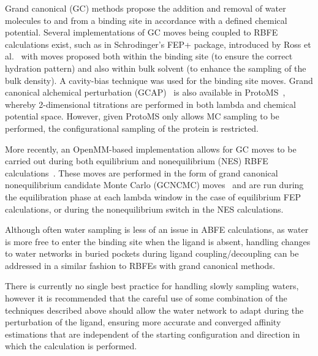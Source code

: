 \documentclass[9pt,bestpractices]{livecoms}
\begin{document}
Grand canonical (GC) methods propose the addition and removal of water molecules to and from a binding site in accordance with a defined chemical potential. Several implementations of GC moves being coupled to RBFE calculations exist, such as in Schrodinger's FEP+ package, introduced by Ross et al.~\cite{ross2020enhancing} with moves proposed both within the binding site (to ensure the correct hydration pattern) and also within bulk solvent (to enhance the sampling of the bulk density). A cavity-bias technique was used for the binding site moves. Grand canonical alchemical perturbation (GCAP)~\cite{brucemacdonald2018ligand} is also available in ProtoMS~\cite{woods2018protoms}, whereby 2-dimensional titrations are performed in both lambda and chemical potential space. However, given ProtoMS only allows MC sampling to be performed, the configurational sampling of the protein is restricted.

More recently, an OpenMM-based implementation allows for GC moves to be carried out during both equilibrium and nonequilibrium (NES) RBFE calculations~\cite{melling2025developing}. These moves are performed in the form of grand canonical nonequilibrium candidate Monte Carlo (GCNCMC) moves~\cite{melling2023enhanced} and are run during the equilibration phase at each lambda window in the case of equilibrium FEP calculations, or during the nonequilibrium switch in the NES calculations.

Although often water sampling is less of an issue in ABFE calculations, as water is more free to enter the binding site when the ligand is absent, handling changes to water networks in buried pockets during ligand coupling/decoupling can be addressed in a similar fashion to RBFEs with grand canonical methods. 


There is currently no single best practice for handling slowly sampling waters, however it is recommended that the careful use of some combination of the techniques described above should allow the water network to adapt during the perturbation of the ligand, ensuring more accurate and converged affinity estimations that are independent of the starting configuration and direction in which the calculation is performed.
\end{document}
